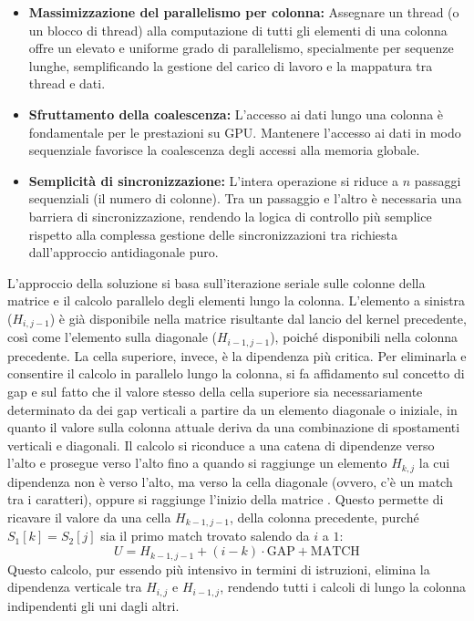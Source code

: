 \documentclass[a4paper,12pt]{article}
\begin{document}
\begin{itemize}
    \item \textbf{Massimizzazione del parallelismo per colonna:} Assegnare un thread (o un blocco di thread) alla computazione di tutti gli elementi di una colonna offre un elevato e uniforme grado di parallelismo, specialmente per sequenze lunghe, semplificando la gestione del carico di lavoro e la mappatura tra thread e dati.
    \item \textbf{Sfruttamento della coalescenza:} L'accesso ai dati lungo una colonna è fondamentale per le prestazioni su GPU. Mantenere l'accesso ai dati in modo sequenziale favorisce la coalescenza degli accessi alla memoria globale.
    \item \textbf{Semplicità di sincronizzazione:} L'intera operazione si riduce a $n$ passaggi sequenziali (il numero di colonne). Tra un passaggio e l'altro è necessaria una barriera di sincronizzazione, rendendo la logica di controllo più semplice rispetto alla complessa gestione delle sincronizzazioni tra richiesta dall'approccio antidiagonale puro.
\end{itemize}

L'approccio della soluzione si basa sull'iterazione seriale sulle colonne della matrice e il calcolo parallelo degli elementi lungo la colonna. L'elemento a sinistra ($H_{i, j-1}$) è già disponibile nella matrice risultante dal lancio del kernel precedente, così come l'elemento sulla diagonale ($H_{i-1, j-1}$), poiché disponibili nella colonna precedente.
La cella superiore, invece, è la dipendenza più critica. Per eliminarla e consentire il calcolo in parallelo lungo la colonna, si fa affidamento sul concetto di gap e sul fatto che il valore stesso della cella superiore sia necessariamente determinato da dei gap verticali a partire da un elemento diagonale o iniziale, in quanto il valore sulla colonna attuale deriva da una combinazione di spostamenti verticali e diagonali.
Il calcolo si riconduce a una catena di dipendenze verso l'alto e prosegue verso l'alto fino a quando si raggiunge un elemento $H_{k,j}$ la cui dipendenza non è verso l'alto, ma verso la cella diagonale (ovvero, c'è un match tra i caratteri), oppure si raggiunge l'inizio della matrice \cite{chen_new_2010}.
Questo permette di ricavare il valore da una cella $H_{k-1, j-1}$, della colonna precedente, purché $S_1[k] = S_2[j]$ sia il primo match trovato salendo da $i$ a $1$:
$$
U = H_{k-1, j-1} + (i-k) \cdot \text{GAP} + \text{MATCH}
$$
Questo calcolo, pur essendo più intensivo in termini di istruzioni, elimina la dipendenza verticale tra $H_{i,j}$ e $H_{i-1, j}$, rendendo tutti i calcoli di lungo la colonna indipendenti gli uni dagli altri.
\end{document}
